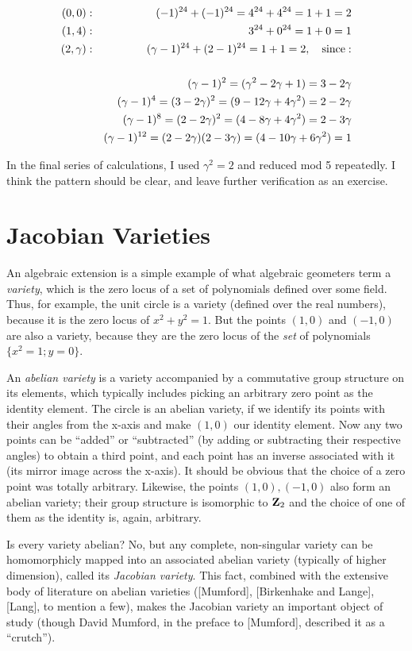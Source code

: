 \begin{eqnarray*}
(0,0) &:& (-1)^{24} + (-1)^{24} = 4^{24} + 4^{24} = 1+1 = 2 \cr
(1,4) &:& 3^{24} + 0^{24} = 1 + 0 = 1 \cr
(2,\gamma) &:& (\gamma-1)^{24} + (2-1)^{24} = 1+1 = 2 {\rm ,\quad since:} \cr
&&\cr
&& (\gamma-1)^2 = (\gamma^2-2\gamma+1) = 3-2\gamma \cr
&& (\gamma-1)^4 = (3-2\gamma)^2 = (9-12\gamma+4\gamma^2) = 2-2\gamma \cr
&& (\gamma-1)^8 = (2-2\gamma)^2 = (4-8\gamma+4\gamma^2) = 2-3\gamma \cr
&& (\gamma-1)^{12} = (2-2\gamma)(2-3\gamma) = (4-10\gamma+6\gamma^2) = 1 \cr
\end{eqnarray*}

In the final series of calculations, I used $\gamma^2=2$ and reduced
mod 5 repeatedly.  I think the pattern should be clear, and leave
further verification as an exercise.

\endexample

\section{Jacobian Varieties}

An algebraic extension is a simple example of what algebraic geometers
term a {\it variety}, which is the zero locus of a set of polynomials
defined over some field.  Thus, for example, the unit circle is a
variety (defined over the real numbers), because it is the zero locus
of $x^2+y^2=1$.  But the points $(1,0)$ and $(-1,0)$ are also a
variety, because they are the zero locus of the {\it set} of
polynomials $\{x^2=1; y=0\}$.

An {\it abelian variety} is a variety accompanied by a commutative
group structure on its elements, which typically includes picking an
arbitrary zero point as the identity element.  The circle is an
abelian variety, if we identify its points with their angles from the
x-axis and make $(1,0)$ our identity element.  Now any two points can
be ``added'' or ``subtracted'' (by adding or subtracting their
respective angles) to obtain a third point, and each point has an
inverse associated with it (its mirror image across the x-axis).  It
should be obvious that the choice of a zero point was totally
arbitrary.  Likewise, the points ${(1,0), (-1,0)}$ also form an
abelian variety; their group structure is isomorphic to ${\bf Z}_2$ and
the choice of one of them as the identity is, again, arbitrary.

Is every variety abelian?  No, but any complete, non-singular variety
can be homomorphicly mapped into an associated abelian variety
(typically of higher dimension), called its {\it Jacobian variety}.
This fact, combined with the extensive body of literature on abelian
varieties ([Mumford], [Birkenhake and Lange], [Lang], to mention a
few), makes the Jacobian variety an important object of study (though
David Mumford, in the preface to [Mumford], described it as a
``crutch'').

